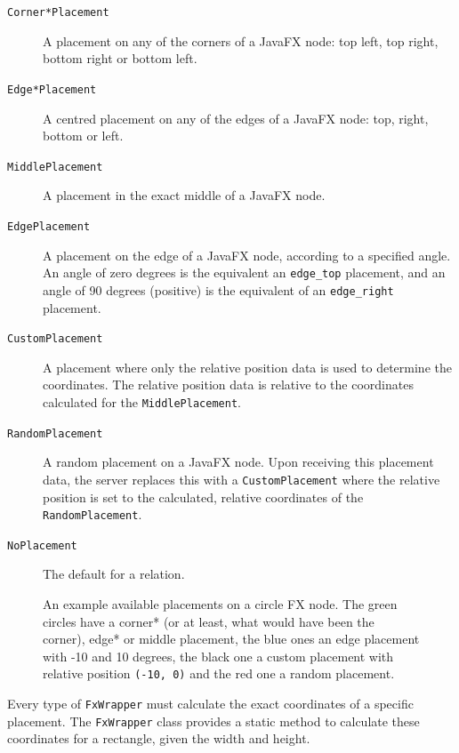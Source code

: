 \documentclass[a4paper]{article}
\begin{document}
\begin{description}
\item[\texttt{Corner*Placement}] A placement on any of the corners of a JavaFX node: top left, top right, bottom right or bottom left.
\item[\texttt{Edge*Placement}]  A centred placement on any of the edges of a JavaFX node: top, right, bottom or left.
\item[\texttt{MiddlePlacement}] A placement in the exact middle of a JavaFX node.
\item[\texttt{EdgePlacement}]   A placement on the edge of a JavaFX node, according to a specified angle. An angle of zero degrees is the equivalent an \lstinline{edge_top} placement, and an angle of 90 degrees (positive) is the equivalent of an \lstinline{edge_right} placement. 
\item[\texttt{CustomPlacement}] A placement where only the relative position data is used to determine the coordinates. The relative position data is relative to the coordinates calculated for the \lstinline{MiddlePlacement}.
\item[\texttt{RandomPlacement}] A random placement on a JavaFX node. Upon receiving this placement data, the server replaces this with a \lstinline{CustomPlacement} where the relative position is set to the calculated, relative coordinates of the \lstinline{RandomPlacement}.
\item[\texttt{NoPlacement}] The default for a relation.
\end{description}

\begin{figure}[!ht]
  \centering
  \caption{An example available placements on a circle FX node. The green circles have a corner* (or at least, what would have been the corner), edge* or middle placement, the blue ones an edge placement with -10 and 10 degrees, the black one a custom placement with relative position \lstinline{(-10, 0)} and the red one a random placement.}
  \label{fig:placements}
\end{figure}
Every type of \lstinline{FxWrapper} must calculate the exact coordinates of a specific placement. The \lstinline{FxWrapper} class provides a static method to calculate these coordinates for a rectangle, given the width and height.
\end{document}
